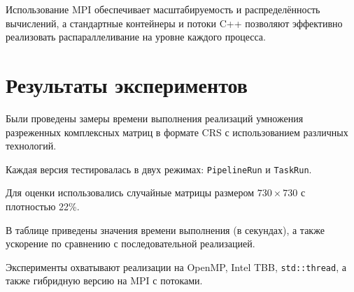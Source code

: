 \documentclass[a4paper,12pt]{article}
\begin{document}
Использование MPI обеспечивает масштабируемость и распределённость вычислений, а стандартные контейнеры и потоки C++ позволяют эффективно реализовать распараллеливание на уровне каждого процесса.

\newpage

\section{Результаты экспериментов}

\hspace*{1.25em}Были проведены замеры времени выполнения реализаций умножения разреженных комплексных матриц в формате CRS с использованием различных технологий.  

\hspace*{1.25em}Каждая версия тестировалась в двух режимах:  \texttt{PipelineRun} и \texttt{TaskRun}. 

\hspace*{1.25em}Для оценки использовались случайные матрицы размером $730 \times 730$ с плотностью 22\%.  

\hspace*{1.25em}В таблице приведены значения времени выполнения (в секундах), а также ускорение по сравнению с последовательной реализацией.  

\hspace*{1.25em}Эксперименты охватывают реализации на OpenMP, Intel TBB, \texttt{std::thread}, а также гибридную версию на MPI с потоками.  
\end{document}
